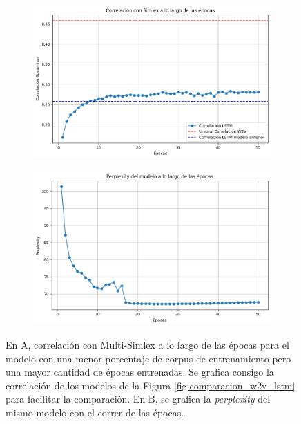 \begin{figure}[H]
    \centering
    \begin{subfigure}[b]{0.8\textwidth}
        \centering
        \includegraphics[width=1\textwidth]{imagenes/simlex_corr_10per.png}
        \caption{}
        \label{fig:simlex_corr_10per.png}
    \end{subfigure}
    \hfill
    \begin{subfigure}[b]{0.8\textwidth}
        \centering
        \includegraphics[width=1\textwidth]{imagenes/perp_10per.png}
        \caption{}
        \label{fig:perp_10per.png}
    \end{subfigure}
    \caption{En A, correlación con Multi-Simlex a lo largo de las épocas para el modelo con 
    una menor porcentaje de corpus de entrenamiento pero una mayor cantidad de épocas 
    entrenadas. Se grafica consigo la correlación de los modelos de la Figura \ref{fig:comparacion_w2v_lstm} para 
    facilitar la comparación. En B, se grafica la \textit{perplexity} del mismo modelo con el correr 
    de las épocas.}
    \label{fig:10per}
\end{figure}

